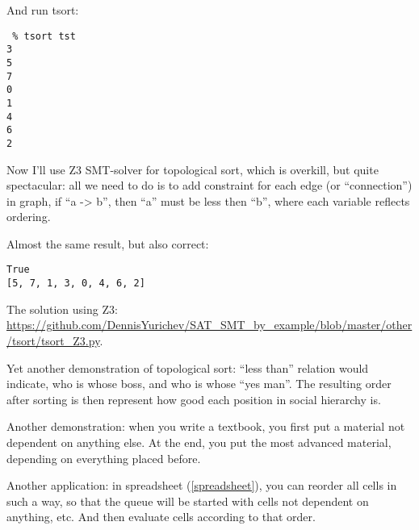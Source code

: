 And run tsort:

\begin{lstlisting}
 % tsort tst
3
5
7
0
1
4
6
2
\end{lstlisting}

Now I'll use Z3 SMT-solver for topological sort, which is overkill, but quite spectacular: all we need to do
is to add constraint for each edge (or ``connection'') in graph, if ``a -> b'', then ``a'' must be less then ``b'', where
each variable reflects ordering.



Almost the same result, but also correct:

\begin{lstlisting}
True
[5, 7, 1, 3, 0, 4, 6, 2]
\end{lstlisting}

The solution using Z3: \url{https://github.com/DennisYurichev/SAT_SMT_by_example/blob/master/other/tsort/tsort_Z3.py}.

Yet another demonstration of topological sort: ``less than'' relation would indicate, 
who is whose boss, and who is whose ``yes man''.
The resulting order after sorting is then represent how good each position in social hierarchy is.

Another demonstration: when you write a textbook, you first put a material not dependent on anything else.
At the end, you put the most advanced material, depending on everything placed before.

Another application: in spreadsheet (\ref{spreadsheet}), you can reorder all cells in such a way, so that the queue will be
started with cells not dependent on anything, etc.
And then evaluate cells according to that order.

